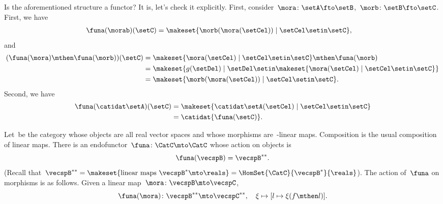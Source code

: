 \begin{example}
    Is the aforementioned structure a functor?
    It is, let's check it explicitly.
    First, consider~$\mora\colon \setA\fto \setB$,~$\morb\colon \setB \fto \setC$.
    First, we have
    \begin{equation}
        \begin{aligned}
            \funa(\morab)(\setC) & =\makeset{ \morb(\mora(\setCel))\mid \setCel \setin \setC},
        \end{aligned}
    \end{equation}
    and
    \begin{equation}
        \begin{aligned}
            (\funa(\mora)\mthen \funa(\morb))(\setC)
             & =\makeset{ \mora(\setCel) \mid \setCel \setin \setC}\mthen \funa(\morb) \\
             & =\makeset{g(\setDel)\mid \setDel \setin \makeset{\mora(\setCel)\mid \setCel\setin \setC}} \\
             & =\makeset{ \morb(\mora(\setCel))\mid \setCel \setin \setC}.
        \end{aligned}
    \end{equation}
    Second, we have
    \begin{equation}
        \begin{aligned}
            \funa(\catidat\setA)(\setC) & = \makeset{\catidat\setA(\setCel)\mid \setCel \setin \setC} \\
                                        & =\catidat{\funa(\setC)}.
        \end{aligned}
    \end{equation}
\end{example}

\begin{example}
    \label{exa:double-dual-functor}
    Let~\CatC be the category whose objects are all real vector spaces and whose morphisms are~\reals-linear maps.
    Composition is the usual composition of linear maps.
    There is an endofunctor~$\funa \colon \CatC \mto \CatC$ whose action on objects is
    \begin{equation}
        \funa ( \vecspB ) = \vecspB^{**}.
    \end{equation}
    (Recall that~$\vecspB^{**} = \makeset{ \text{linear maps } \vecspB^* \mto \reals } =  \HomSet{\CatC}{\vecspB^*}{\reals}$).
    The action of~$\funa$ on morphisms is as follows.
    Given a linear map~$\mora \colon \vecspB \mto \vecspC$,
    \begin{equation}
        \funa ( \mora ) \colon \vecspB^{**} \mto \vecspC^{**}, \quad \xi \mapsto [ l \mapsto \xi (f \mthen l)].
    \end{equation}
\end{example}

